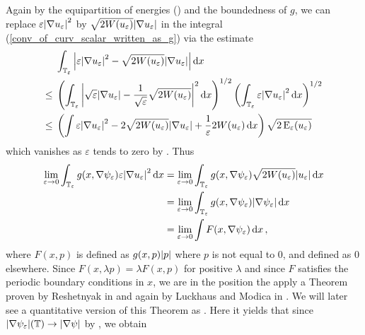 Again by the equipartition of energies () and the boundedness of $ g $, we can replace $ \varepsilon \abs{ \nabla u_{ \varepsilon } }^{ 2 } $ by $ \sqrt{ 2 W ( u_{ \varepsilon } ) } \abs{ \nabla u_{ \varepsilon } } $ in the integral (\ref{conv_of_curv_scalar_written_as_g}) via the estimate
\begin{align*}
	& \int_{ \operatorname{\mathbb{T}}_{ \varepsilon } }
		\abs{ 
			\varepsilon \abs{ \nabla u_{ \varepsilon } }^{ 2 }
			-
			\sqrt{ 2 W ( u_{ \varepsilon } ) } \abs{ \nabla u_{\varepsilon } }
		}
	\dd{ x }
	\\
	\leq {} &
	\left(
		\int_{ \operatorname{\mathbb{T}}_{ \varepsilon } }
			\abs{ 
				\sqrt{ \varepsilon } \abs{ \nabla u_{ \varepsilon } } 
				- 
				\frac{ 1 }{ \sqrt{ \varepsilon } } \sqrt{ 2 W ( u_{ \varepsilon } ) } 
			}^{ 2 }
		\dd{ x }
	\right)^{ 1/2 }
	\left(
		\int_{ \operatorname{\mathbb{T}}_{ \varepsilon } }
			\varepsilon \abs{ \nabla u_{ \varepsilon } }^{ 2 }
		\dd{ x }
	\right)^{ 1/ 2 }
	\\
	\leq {} &
	\left(
		\int
			\varepsilon \abs{ \nabla u_{ \varepsilon } }^{ 2 }
			-
			2 \sqrt{ 2 W ( u_{ \varepsilon } ) } \abs{ \nabla u_{ \varepsilon } }
			+
			\frac{ 1 }{ \varepsilon }
			2 W ( u_{ \varepsilon } )
		\dd{ x }
	\right)
	\sqrt{ 2 \operatorname{E}_{ \varepsilon } ( u_{ \varepsilon } ) }
\end{align*}
which vanishes as $ \varepsilon $ tends to zero by .
Thus
\begin{align*}
	\lim_{ \varepsilon \to 0 }
	\int_{ \operatorname{\mathbb{T}}_{ \varepsilon } }
		g ( x , \nabla \psi_{ \varepsilon  } )
		\varepsilon \abs{ \nabla u_{ \varepsilon } }^{ 2 }
	\dd{ x }
	& =
	\lim_{ \varepsilon \to 0 }
		\int_{ \operatorname{\mathbb{T}}_{ \varepsilon } }
			g ( x , \nabla \psi_{ \varepsilon  } )
		\sqrt{ 2 W ( u_{ \varepsilon } ) } 
		\abs{ u_{ \varepsilon } }
	\dd{ x }
	 \\
	 & =
	 \lim_{ \varepsilon \to 0 }
	 	\int_{ \operatorname{\mathbb{T}}_{ \varepsilon } }
	 		g ( x , \nabla \psi_{ \varepsilon  } ) \abs{ \nabla \psi_{ \varepsilon  } }
	 	\dd{ x }
	 \\
	 & = 
	 \lim_{ \varepsilon \to 0 }
	 	\int
	 		F ( x, \nabla \psi_{ \varepsilon } )
	 	\dd{ x },
\end{align*}
where $ F ( x, p ) $ is defined as $ g ( x , p ) \abs{ p } $ where $ p $ is not equal to 0, and defined as 0 elsewhere. Since $ F (x , \lambda p ) = \lambda F ( x, p ) $ for positive $ \lambda $ and since $ F $ satisfies the periodic boundary conditions in $ x $, we are in the position the apply a Theorem proven by Reshetnyak in \cite{Reshetnyak_weak_convergence} and again by Luckhaus and Modica in \cite[]{luckhaus_modica_gibbs_thompson_relation}. We will later see a quantitative version of this Theorem as . Here it yields that since $ \abs{ \nabla \psi_{ \varepsilon  } } ( \operatorname{\mathbb{T}} ) \to \abs{ \nabla \psi } $ by , we obtain
